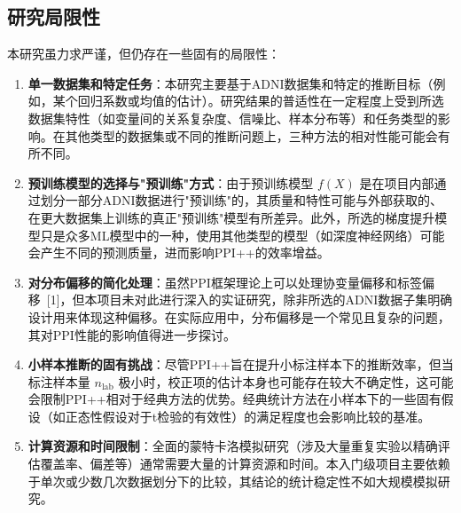 \documentclass[12pt,a4paper]{article}
\begin{document}
\subsection{研究局限性}
\label{sec:limitations}
本研究虽力求严谨，但仍存在一些固有的局限性：
\begin{enumerate}
    \item \textbf{单一数据集和特定任务}：本研究主要基于ADNI数据集和特定的推断目标（例如，某个回归系数或均值的估计）。研究结果的普适性在一定程度上受到所选数据集特性（如变量间的关系复杂度、信噪比、样本分布等）和任务类型的影响。在其他类型的数据集或不同的推断问题上，三种方法的相对性能可能会有所不同。
    \item \textbf{预训练模型的选择与"预训练"方式}：由于预训练模型 $f(X)$ 是在项目内部通过划分一部分ADNI数据进行"预训练"的，其质量和特性可能与外部获取的、在更大数据集上训练的真正"预训练"模型有所差异。此外，所选的梯度提升模型只是众多ML模型中的一种，使用其他类型的模型（如深度神经网络）可能会产生不同的预测质量，进而影响PPI++的效率增益。
    \item \textbf{对分布偏移的简化处理}：虽然PPI框架理论上可以处理协变量偏移和标签偏移~{[1]}，但本项目未对此进行深入的实证研究，除非所选的ADNI数据子集明确设计用来体现这种偏移。在实际应用中，分布偏移是一个常见且复杂的问题，其对PPI性能的影响值得进一步探讨。
    \item \textbf{小样本推断的固有挑战}：尽管PPI++旨在提升小标注样本下的推断效率，但当标注样本量 $n_{\text{lab}}$ 极小时，校正项的估计本身也可能存在较大不确定性，这可能会限制PPI++相对于经典方法的优势。经典统计方法在小样本下的一些固有假设（如正态性假设对于t检验的有效性）的满足程度也会影响比较的基准。
    \item \textbf{计算资源和时间限制}：全面的蒙特卡洛模拟研究（涉及大量重复实验以精确评估覆盖率、偏差等）通常需要大量的计算资源和时间。本入门级项目主要依赖于单次或少数几次数据划分下的比较，其结论的统计稳定性不如大规模模拟研究。
\end{enumerate}
\end{document}
